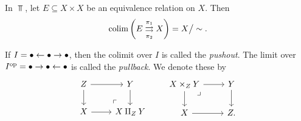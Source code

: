 \documentclass{article}[11pt]
\renewcommand{\dot}{\bullet }
\begin{document}
\begin{example} In $\Top$, let $E\subseteq X\times X$ be an equivalence relation on $X$. Then
	\begin{align*}
		\mathop{\operatorname*{colim}} \left( E \underset{\pi_2}{\overset{\pi_1}{\rightrightarrows}} X \right) = X\big/\sim.
	\end{align*}
\end{example}

\begin{definition} If $I = \dot \from \dot \to \dot$, then the colimit over $I$ is called the \textit{pushout}. The limit over $I^\op = \dot \to \dot \from \dot$ is called the \textit{pullback}. We denote these by
\[
	\begin{tikzcd}
	Z\dar\rar & Y\dar \\
	X\rar & X\amalg_Z Y\po
	\end{tikzcd}\quad\quad
	\begin{tikzcd}
	X\times_Z Y \pb\rar\dar & Y\dar \\
	X\rar & Z.
	\end{tikzcd}
\]
\end{definition}
\end{document}

